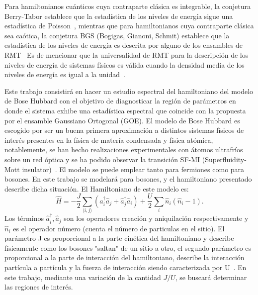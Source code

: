 \documentclass[spanish,titlepage,table]{practicas}
\begin{document}
Para hamiltonianos cuánticos cuya contraparte clásica es integrable, la conjetura Berry-Tabor establece que 
la estadística de los niveles de energía sigue una estadística de Poisson~\cite{BerryTabor1977}, mientras que para hamiltonianos 
cuya contraparte clásica sea caótica, la conjetura BGS (Bogigas, Gianoni, Schmit) establece que la estadística de los niveles de energía es descrita 
por alguno de los ensambles de RMT~\cite{Atas_2013}
Es de mencionar que la universalidad de RMT para la descripción de los niveles de energía de sistemas físicos 
es válida cuando la densidad media de los niveles de energía es igual a la unidad~\cite{Atas_2013}.


Este trabajo consistirá en hacer un estudio espectral del hamiltoniano del modelo de Bose Hubbard 
con el objetivo de diagnosticar la región de parámetros en donde el sistema exhibe una estadística espectral 
que coincide con la propuesta por el ensamble Gaussiano Ortogonal (GOE). El modelo de Bose Hubbard es escogido por ser un buena primera aproximación a distintos sistemas físicos de interés presentes en la física de matería condensada y física atómica, notablemente, 
se han hecho realizaciones experimentales con átomos ultrafríos sobre un red óptica y se ha podido observar la transición SF-MI (Superfluidity-Mott insulator)~\cite{Zhang2010}. 
El modelo se puede emplear tanto para fermiones como para bosones. En este trabajo se modelará para bosones, y el hamiltoniano presentado describe dicha situación. El Hamiltoniano de este modelo es:
\begin{equation}
\hat{H}
= -\frac{J}{2} \sum_{\langle i,j\rangle} \!\left(\hat{a}_i^{\dagger}\hat{a}_j + \hat{a}_j^{\dagger}\hat{a}_i\right)
+ \frac{U}{2}\sum_{i}\hat{n}_i(\hat{n}_i - 1).
\end{equation}
Los términos $\hat{a}_i^{\dagger},\hat{a}_j$ son los operadores creación y aniquilación respectivamente y $\hat{n}_i$ es el operador número (cuenta el número de particulas en el sitio).
El parámetro J es proporcional a la parte cinética del hamiltoniano y describe físicamente como los bosones "saltan" de un sitio a otro, el segundo parámetro es proporcional a la parte de interacción del hamiltoniano, describe 
la interacción partícula a partícula y la fuerza de interacción siendo caracterizada por U~\cite{Zhang2010}. 
En este trabajo, mediante una variación de la cantidad $J/U$, se buscará determinar las regiones de interés.
\end{document}
